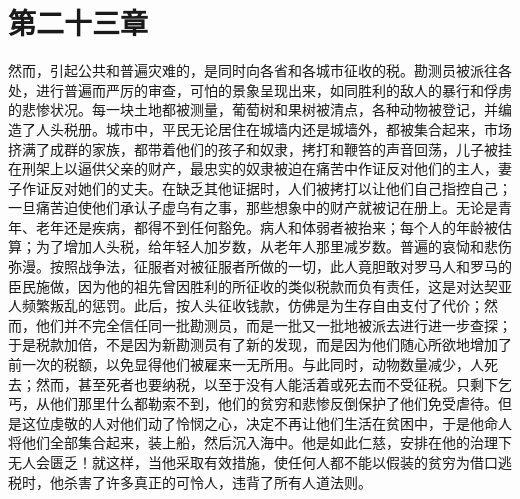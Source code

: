 
\section{第二十三章}

然而，引起公共和普遍灾难的，是同时向各省和各城市征收的税。勘测员被派往各处，进行普遍而严厉的审查，可怕的景象呈现出来，如同胜利的敌人的暴行和俘虏的悲惨状况。每一块土地都被测量，葡萄树和果树被清点，各种动物被登记，并编造了人头税册。城市中，平民无论居住在城墙内还是城墙外，都被集合起来，市场挤满了成群的家族，都带着他们的孩子和奴隶，拷打和鞭笞的声音回荡，儿子被挂在刑架上以逼供父亲的财产，最忠实的奴隶被迫在痛苦中作证反对他们的主人，妻子作证反对她们的丈夫。在缺乏其他证据时，人们被拷打以让他们自己指控自己；一旦痛苦迫使他们承认子虚乌有之事，那些想象中的财产就被记在册上。无论是青年、老年还是疾病，都得不到任何豁免。病人和体弱者被抬来；每个人的年龄被估算；为了增加人头税，给年轻人加岁数，从老年人那里减岁数。普遍的哀恸和悲伤弥漫。按照战争法，征服者对被征服者所做的一切，此人竟胆敢对罗马人和罗马的臣民施做，因为他的祖先曾因胜利的所征收的类似税款而负有责任，这是对达契亚人频繁叛乱的惩罚。此后，按人头征收钱款，仿佛是为生存自由支付了代价；然而，他们并不完全信任同一批勘测员，而是一批又一批地被派去进行进一步查探；于是税款加倍，不是因为新勘测员有了新的发现，而是因为他们随心所欲地增加了前一次的税额，以免显得他们被雇来一无所用。与此同时，动物数量减少，人死去；然而，甚至死者也要纳税，以至于没有人能活着或死去而不受征税。只剩下乞丐，从他们那里什么都勒索不到，他们的贫穷和悲惨反倒保护了他们免受虐待。但是这位虔敬的人对他们动了怜悯之心，决定不再让他们生活在贫困中，于是他命人将他们全部集合起来，装上船，然后沉入海中。他是如此仁慈，安排在他的治理下无人会匮乏！就这样，当他采取有效措施，使任何人都不能以假装的贫穷为借口逃税时，他杀害了许多真正的可怜人，违背了所有人道法则。\par


\section{}

